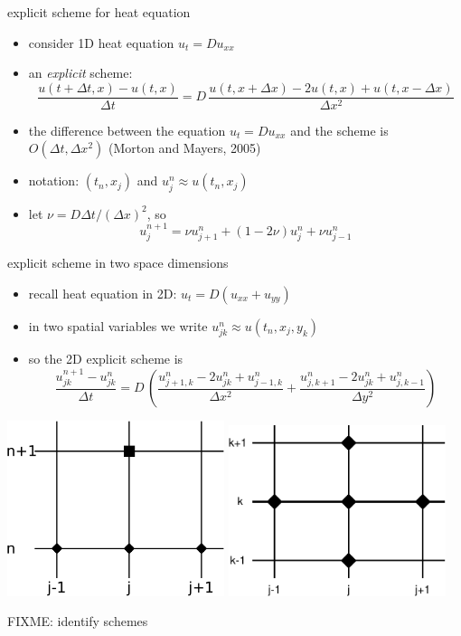 \documentclass[titlepage,letterpaper,final,12pt]{scrartcl}
\begin{document}
explicit scheme for heat equation

\begin{itemize}
\item consider 1D heat equation $u_t = D u_{xx}$
\item an \emph{explicit} scheme:
	$$\frac{u(t+\Delta t,x) - u(t,x)}{\Delta t} = D\,\frac{u(t,x+\Delta x) - 2 u(t,x) + u(t,x-\Delta x)}{\Delta x^2}$$
\item the difference between the equation $u_t = D u_{xx}$ and the scheme is $O(\Delta t,\Delta x^2)$ (Morton and Mayers, 2005)\nocite{MortonMayers}
\item notation: $(t_n,x_j)$ and $u_j^n \approx u(t_n,x_j)$
\item let $\nu = D \Delta t / (\Delta x)^2$, so
	$$u_j^{n+1} = \nu u_{j+1}^n + (1 - 2 \nu) u_j^n + \nu u_{j-1}^n$$
\end{itemize}


explicit scheme in two space dimensions

\begin{itemize}
\item recall heat equation in 2D: $u_t = D(u_{xx} + u_{yy})$
\item in two spatial variables we write $u_{jk}^n \approx u(t_n,x_j,y_k)$
\item so the 2D explicit scheme is
	$$\frac{u_{jk}^{n+1} - u_{jk}^n}{\Delta t} = D\,\left(\frac{u_{j+1,k}^n - 2 u_{jk}^n + u_{j-1,k}^n}{\Delta x^2} + \frac{u_{j,k+1}^n - 2 u_{jk}^n + u_{j,k-1}^n}{\Delta y^2}\right)$$
\end{itemize}

\begin{center}
\includegraphics[width=2.5in]{expstencil}
\quad
\includegraphics[width=2.5in]{exp2dstencil}

FIXME: identify schemes
\end{center}
\end{document}
